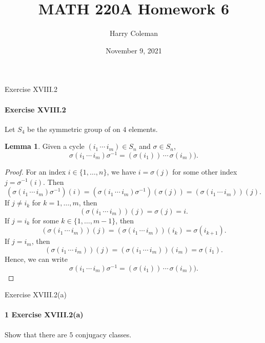 \documentclass[12pt]{article}
\renewcommand{\maketitle}{\thispagestyle{title}}
\newlength{\myparskip}
\newenvironment{fullbox}{\begin{lrbox}{\savefullbox}\begin{minipage}{\dimexpr\textwidth-2\fboxsep\relax}\setlength{\parskip}{\myparskip}}{\end{minipage}\end{lrbox}\framebox[\textwidth]{\usebox{\savefullbox}}}
\newenvironment{pbox}[1][]{\begin{fullbox}\ifx#1\empty\else\paragraph{#1}\fi}{\end{fullbox}}
\newcommand{\<}{\langle}
\renewcommand{\>}{\rangle}
\theoremstyle{definition}
\newtheorem{lemma}{Lemma}
\begin{document}
\title{MATH 220A Homework 6}
\author{Harry Coleman\makebox[0pt][r]{\raisebox{-0.25in}[0pt][0pt]{(worked with Joseph Sullivan and Gahl Shemy)}}}
\date{November 9, 2021}
\maketitle

\begin{pbox}[Exercise XVIII.2]
    Let $S_4$ be the symmetric group of on $4$ elements.
\end{pbox}

\begin{lemma}
    Given a cycle $(i_1 \, \cdots \, i_m) \in S_n$ and $\sigma \in S_n$,
    \[
        \sigma(i_1 \, \cdots \, i_m)\sigma^{-1} = (\sigma(i_1)) \, \cdots \, \sigma(i_m)).
    \]
\end{lemma}

\begin{proof}
    For an index $i \in \{1, \ldots, n\}$, we have $i = \sigma(j)$ for some other index $j = \sigma^{-1}(i)$. Then
    \[
        (\sigma(i_1 \, \cdots \, i_m)\sigma^{-1})(i)
            = (\sigma(i_1 \, \cdots \, i_m)\sigma^{-1})(\sigma(j))
            = (\sigma(i_1 \, \cdots \, i_m))(j).
    \]
    If $j \ne i_k$ for $k = 1, \dots, m$, then
    \[
        (\sigma(i_1 \, \cdots \, i_m))(j)
            = \sigma(j)
            = i.
    \]
    If $j = i_k$ for some $k \in \{1, \dots, m - 1\}$, then
    \[
        (\sigma(i_1 \, \cdots \, i_m))(j)
            = (\sigma(i_1 \, \cdots \, i_m))(i_k)
            = \sigma(i_{k+1}).
    \]
    If $j = i_m$, then
    \[
        (\sigma(i_1 \, \cdots \, i_m))(j)
            = (\sigma(i_1 \, \cdots \, i_m))(i_m)
            = \sigma(i_1).
    \]
    Hence, we can write
    \[
        \sigma(i_1 \, \cdots \, i_m)\sigma^{-1} = (\sigma(i_1)) \, \cdots \, \sigma(i_m)).
    \]
\end{proof}

\begin{pbox}[1 Exercise XVIII.2(a)]
    Show that there are $5$ conjugacy classes.
\end{pbox}
\end{document}
